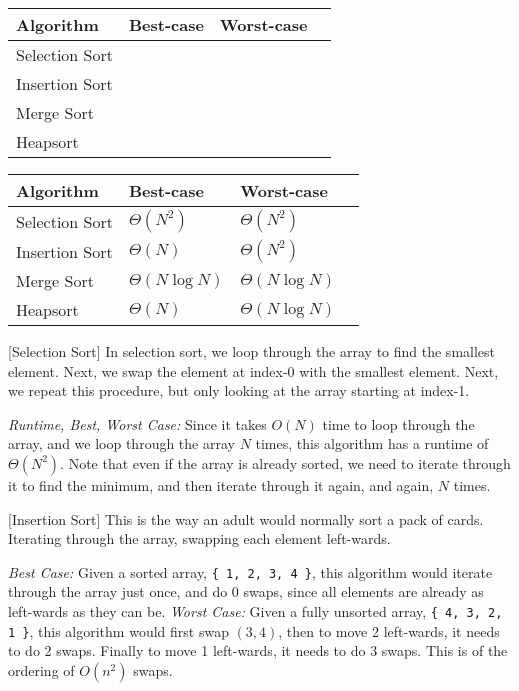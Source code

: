 \ifprintanswers\else

\renewcommand{\arraystretch}{2}
\setlength{\tabcolsep}{12pt}
\begin{tabularx}{\textwidth}{Xlll}
Algorithm         & Best-case & Worst-case  \\\hline
Selection Sort    &           &             \\
Insertion Sort    &           &             \\
Merge Sort        &           &             \\
Heapsort          &           &                   
\end{tabularx}

\fi

\begin{solution}
\renewcommand{\arraystretch}{2}
\setlength{\tabcolsep}{12pt}
\begin{tabularx}{\textwidth}{Xlll}
Algorithm         & Best-case          & Worst-case \\\hline
Selection Sort    & $\Theta(N^2)$      & $\Theta(N^2)$\\
Insertion Sort    & $\Theta(N)$        & $\Theta(N^2)$\\
Merge Sort        & $\Theta(N \log N)$ & $\Theta(N \log N)$\\
Heapsort          & $\Theta(N)$        & $\Theta(N \log N)$	 
\end{tabularx}


[Selection Sort]
In selection sort, we loop through the array to find the smallest element.
Next, we swap the element at index-0 with the smallest element. Next, we repeat
this procedure, but only looking at the array starting at index-1.


\textit{Runtime, Best, Worst Case:} Since it takes $O(N)$ time to loop
through the array, and we loop through the array $N$ times, this algorithm has
a runtime of $\Theta(N^2)$. Note that even if the array is already sorted, we
need to iterate through it to find the minimum, and then iterate through it
again, and again, $N$ times.

[Insertion Sort]
This is the way an adult would normally sort a pack of cards. Iterating through
the array, swapping each element left-wards.


\textit{Best Case:} Given a sorted array, \lstinline${ 1, 2, 3, 4 }$,
this algorithm would iterate through the array just once, and do 0 swaps, since
all elements are already as left-wards as they can be.
\textit{Worst Case:} Given a fully unsorted array,
\lstinline${ 4, 3, 2, 1 }$, this algorithm would first swap $(3, 4)$, then to
move 2 left-wards, it needs to do 2 swaps. Finally to move 1 left-wards, it
needs to do 3 swaps. This is of the ordering of $O(n^2)$ swaps.


\end{solution}
